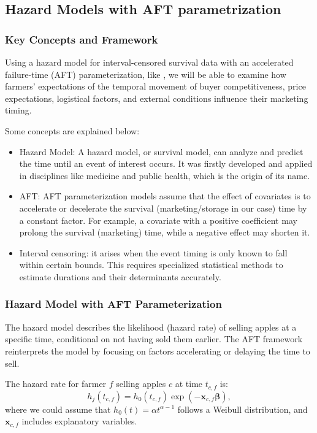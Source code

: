 \documentclass[12pt]{article}
\begin{document}
\newpage
\subsection{Hazard Models with AFT parametrization}
\subsubsection{Key Concepts and Framework}
Using a hazard model for interval-censored survival data with an accelerated failure-time (AFT) parameterization, like \cite{albuquerque2024market}, we will be able to examine how farmers' expectations of the temporal movement of buyer competitiveness, price expectations, logistical factors, and external conditions influence their marketing timing.

Some concepts are explained below:
\begin{itemize}
    \item Hazard Model: A hazard model, or survival model, can analyze and predict the time until an event of interest occurs. It was firstly developed and applied in disciplines like medicine and public health, which is the origin of its name. 
    \item AFT: AFT parameterization models assume that the effect of covariates is to accelerate or decelerate the survival (marketing/storage in our case) time by a constant factor. For example, a covariate with a positive coefficient may prolong the survival (marketing) time, while a negative effect may shorten it.
    \item Interval censoring: it arises when the event timing is only known to fall within certain bounds. This requires specialized statistical methods to estimate durations and their determinants accurately. 
\end{itemize}



\subsubsection{Hazard Model with AFT Parameterization}
The hazard model describes the likelihood (hazard rate) of selling apples at a specific time, conditional on not having sold them earlier. The AFT framework reinterprets the model by focusing on factors accelerating or delaying the time to sell.

The hazard rate for farmer $f$ selling apples $c$ at time $t_{c,f}$ is:
$$
    h_j(t_{c,f}) = h_0(t_{c,f}) \exp\left(-\mathbf{x}_{c,f} \boldsymbol{\beta}\right),
$$
where we could assume that $h_0(t) = \alpha t^{\alpha-1}$ follows a Weibull distribution, and $\mathbf{x}_{c,f}$ includes explanatory variables.
\end{document}
